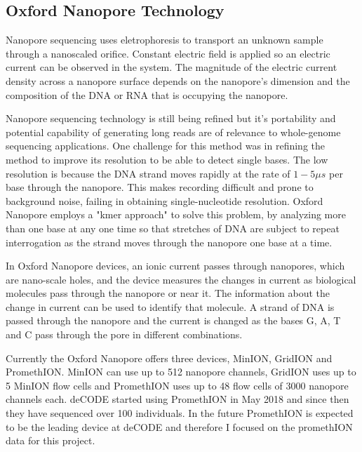 
\subsection{Oxford Nanopore Technology}
\label{sec:background:ONT}



Nanopore sequencing uses eletrophoresis to transport an unknown sample through a nanoscaled orifice. Constant electric field is applied so an electric current can be observed in the system. The magnitude of the electric current density across a nanopore surface depends on the nanopore's dimension and the composition of the DNA or RNA that is occupying the nanopore. 

Nanopore sequencing technology is still being refined but it's portability and potential capability of generating long reads are of relevance to whole-genome sequencing applications. One challenge for this method was in refining the method to improve its resolution to be able to detect single bases. The low resolution is because the DNA strand moves rapidly at the rate of $1-5 \mu s$ per base through the nanopore. This makes recording difficult and prone to background noise, failing in obtaining single-nucleotide resolution. Oxford Nanopore employs a "kmer approach" to solve this problem, by analyzing more than one base at any one time so that stretches of DNA are subject to repeat interrogation as the strand moves through the nanopore one base at a time. %

In Oxford Nanopore devices, an ionic current passes through nanopores, which are nano-scale holes, and the device measures the changes in current as biological molecules pass through the nanopore or near it. The information about the change in current can be used to identify that molecule. A strand of DNA is passed through the nanopore and the current is changed as the bases G, A, T and C pass through the pore in different combinations. %

Currently the Oxford Nanopore offers three devices, MinION, GridION and PromethION. MinION can use up to 512 nanopore channels, GridION uses up to 5 MinION flow cells and PromethION uses up to 48 flow cells of 3000 nanopore channels each. deCODE started using PromethION in May 2018 and since then they have sequenced over 100 individuals. In the future PromethION is expected to be the leading device at deCODE and therefore I focused on the promethION data for this project.

